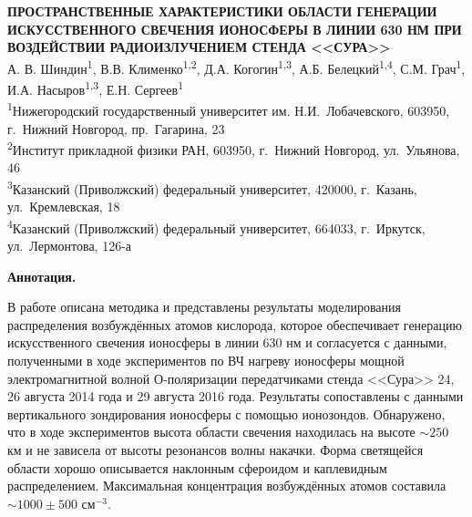 \documentclass[12pt,a4paper]{article}
\begin{document}

\begin{center}
	{\large\bf ПРОСТРАНСТВЕННЫЕ ХАРАКТЕРИСТИКИ ОБЛАСТИ ГЕНЕРАЦИИ ИСКУССТВЕННОГО СВЕЧЕНИЯ ИОНОСФЕРЫ В ЛИНИИ 630 НМ ПРИ ВОЗДЕЙСТВИИ РАДИОИЗЛУЧЕНИЕМ СТЕНДА <<СУРА>>}\\
	\vskip 0.5cm
	А. В. Шиндин\textsuperscript{1}, В.В. Клименко\textsuperscript{1,2}, Д.А. Когогин\textsuperscript{1,3}, А.Б. Белецкий\textsuperscript{1,4}, С.М. Грач\textsuperscript{1}, И.А. Насыров\textsuperscript{1,3}, Е.Н. Сергеев\textsuperscript{1}\\
	\vskip 0.5cm
	\textsuperscript{1}Нижегородский государственный университет им. Н.И.~Лобачевского,
	603950, г.~Нижний Новгород, пр.~Гагарина, 23\\
	\textsuperscript{2}Институт прикладной физики РАН,
	603950, г.~Нижний Новгород, ул.~Ульянова, 46\\
	\textsuperscript{3}Казанский (Приволжский) федеральный университет,
	420000, г.~Казань, ул.~Кремлевская, 18\\
	\textsuperscript{4}Казанский (Приволжский) федеральный университет,
	664033, г.~Иркутск, ул.~Лермонтова, 126-а\\
\end{center}
\thispagestyle{empty}
\textbf{Аннотация.}
 
В работе описана методика и представлены результаты моделирования распределения возбуждённых атомов кислорода, которое обеспечивает генерацию искусственного свечения ионосферы в линии 630 нм и согласуется с данными, полученными в ходе экспериментов по ВЧ нагреву ионосферы мощной электромагнитной волной О-поляризации передатчиками стенда <<Сура>> 24, 26 августа 2014 года и 29 августа 2016 года. Результаты сопоставлены с данными вертикального зондирования ионосферы с помощью ионозондов. Обнаружено, что в ходе экспериментов высота области свечения находилась на высоте $\sim250$ км и не зависела от высоты резонансов волны накачки. Форма светящейся области хорошо описывается наклонным сфероидом и каплевидным распределением. Максимальная концентрация возбуждённых атомов составила $\sim1000 \pm 500$ см$^{-3}$.\\
\end{document}
